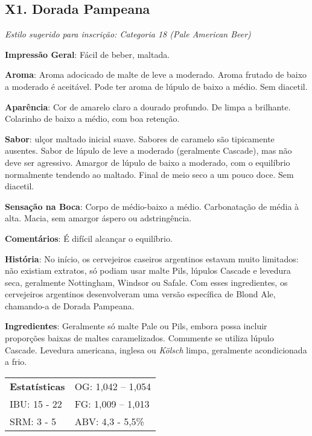 \subsection*{X1. Dorada Pampeana}

\textit{Estilo sugerido para inscrição: Categoria 18 (Pale American Beer)}

\textbf{Impressão Geral}: Fácil de beber, maltada.

\textbf{Aroma}: Aroma adocicado de malte de leve a moderado. Aroma frutado de baixo a moderado é aceitável. Pode ter aroma de lúpulo de baixo a médio. Sem diacetil.

\textbf{Aparência}: Cor de amarelo claro a dourado profundo. De limpa a brilhante. Colarinho de baixo a médio, com boa retenção.

\textbf{Sabor}: ulçor maltado inicial suave. Sabores de caramelo são tipicamente ausentes. Sabor de lúpulo de leve a moderado (geralmente Cascade), mas não deve ser agressivo. Amargor de lúpulo de baixo a moderado, com o equilíbrio normalmente tendendo ao maltado. Final de meio seco a um pouco doce. Sem diacetil.

\textbf{Sensação na Boca}: Corpo de médio-baixo a médio. Carbonatação de média à alta. Macia, sem amargor áspero ou adstringência.

\textbf{Comentários}: É difícil alcançar o equilíbrio.

\textbf{História}: No início, os cervejeiros caseiros argentinos estavam muito limitados: não existiam extratos, só podiam usar malte Pils, lúpulos Cascade e levedura seca, geralmente Nottingham, Windsor ou Safale. Com esses ingredientes, os cervejeiros argentinos desenvolveram uma versão específica de Blond Ale, chamando-a de Dorada Pampeana.

\textbf{Ingredientes}: Geralmente só malte Pale ou Pils, embora possa incluir proporções baixas de maltes caramelizados. Comumente se utiliza lúpulo Cascade. Levedura americana, inglesa ou \textit{Kölsch} limpa, geralmente acondicionada a frio.

\begin{tabular}{@{}p{35mm}p{35mm}@{}}
  \textbf{Estatísticas} & OG: 1,042 – 1,054 \\
  IBU: 15 - 22 & FG: 1,009 – 1,013 \\
  SRM: 3 - 5 & ABV: 4,3 - 5,5\%
\end{tabular}